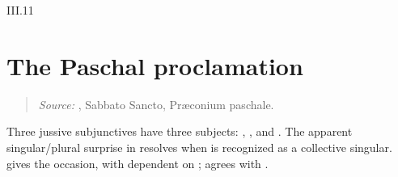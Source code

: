 \begin{courseunit}{III.11}
\section{The Paschal proclamation}

\begin{quote}

\emph{Source:} \Missal, Sabbato Sancto, Præconium paschale.
\end{quote}

Three jussive subjunctives have three subjects: ,
, and . The apparent singular/plural surprise in
 resolves when  is recognized as a
collective singular.  gives the occasion, with
 dependent on ;  agrees
with .




\end{courseunit}

